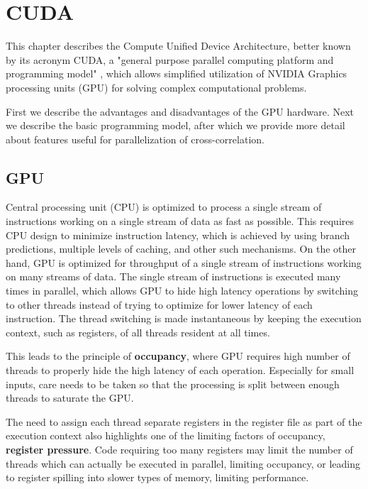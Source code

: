 \chapter{CUDA}

This chapter describes the Compute Unified Device Architecture, better known by its acronym CUDA, a "general purpose parallel computing platform and programming model" \citep{site:cuda}, which allows simplified utilization of NVIDIA Graphics processing units (GPU) for solving complex computational problems.

First we describe the advantages and disadvantages of the GPU hardware. Next we describe the basic programming model, after which we provide more detail about features useful for parallelization of cross-correlation.

\section{GPU}
\label{sec:gpu}

Central processing unit (CPU) is optimized to process a single stream of instructions working on a single stream of data as fast as possible. This requires CPU design to minimize instruction latency, which is achieved by using branch predictions, multiple levels of caching, and other such mechanisms. On the other hand, GPU is optimized for throughput of a single stream of instructions working on many streams of data. The single stream of instructions is executed many times in parallel, which allows GPU to hide high latency operations by switching to other threads instead of trying to optimize for lower latency of each instruction. The thread switching is made instantaneous by keeping the execution context, such as registers, of all threads resident at all times.

This leads to the principle of \textbf{occupancy}, where GPU requires high number of threads to properly hide the high latency of each operation. Especially for small inputs, care needs to be taken so that the processing is split between enough threads to saturate the GPU.

The need to assign each thread separate registers in the register file as part of the execution context also highlights one of the limiting factors of occupancy, \textbf{register pressure}. Code requiring too many registers may limit the number of threads which can actually be executed in parallel, limiting occupancy, or leading to register spilling into slower types of memory, limiting performance.


